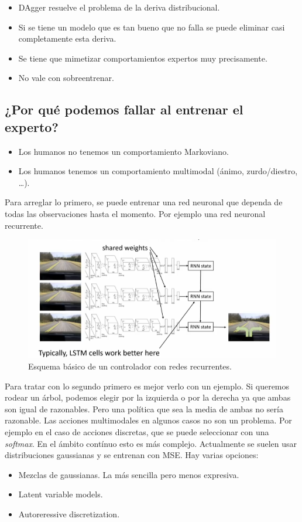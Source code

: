 \begin{itemize}
    \item DAgger resuelve el problema de la deriva distribucional.
    \item Si se tiene un modelo que es tan bueno que no falla se puede eliminar casi
        completamente esta deriva.
    \item Se tiene que mimetizar comportamientos expertos muy precisamente.
    \item No vale con sobreentrenar.
\end{itemize}

\subsection{¿Por qué podemos fallar al entrenar el experto?}%
\label{sub:_por_qué_podemos_fallar_al_entrenar_el_experto_}

\begin{itemize}
    \item Los humanos no tenemos un comportamiento Markoviano.
    \item Los humanos tenemos un comportamiento multimodal (ánimo, zurdo/diestro, \ldots).
\end{itemize}

Para arreglar lo primero, se puede entrenar una red neuronal que dependa de todas las
observaciones hasta el momento. Por ejemplo una red neuronal recurrente.

\begin{figure}[htpb]
	\centering
	\includegraphics[width=0.8\linewidth]{figures/2020-06-11-135236_759x362_scrot.png}
	\caption{Esquema básico de un controlador con redes recurrentes.}
\end{figure}

Para tratar con lo segundo primero es mejor verlo con un ejemplo. Si queremos rodear un
árbol, podemos elegir por la izquierda o por la derecha ya que ambas son igual de razonables.
Pero una política que sea la media de ambas no sería razonable. Las acciones multimodales en
algunos casos no son un problema. Por ejemplo en el caso de acciones discretas, que se
puede seleccionar con una \textit{softmax}. En el ámbito contínuo esto es más complejo.
Actualmente se suelen usar distribuciones gaussianas y se entrenan con MSE. Hay varias opciones:
\begin{itemize}
    \item Mezclas de gaussianas. La más sencilla pero menos expresiva.
    \item Latent variable models.
    \item Autoreressive discretization.
\end{itemize}


